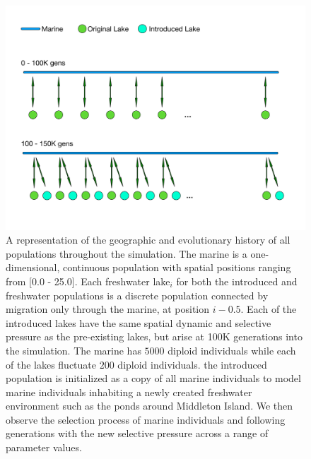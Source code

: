 \documentclass{article}
\begin{document}
\begin{figure}
	\begin{center}
  		\includegraphics[width=0.6\linewidth]{GeographyFigure.pdf}
  		\caption{
			A representation of the geographic and evolutionary history of all populations throughout the simulation. 
		The marine is a one-dimensional, continuous population with spatial positions ranging from [0.0 - 25.0]. 
		Each freshwater lake$_{i}$ for both the introduced and freshwater populations
		is a discrete population connected by migration only through the marine, at position $i - 0.5$. 
		Each of the introduced lakes have the same spatial dynamic and selective pressure as the pre-existing lakes, but arise at 100K generations into the simulation.
		The marine has $5000$ diploid individuals while each of the lakes fluctuate  $200$ diploid individuals. 
		the introduced population is initialized as a copy of all marine individuals to model marine 
		individuals inhabiting a newly created freshwater environment such as the ponds around Middleton Island.
		We then observe the selection process of marine individuals and following generations 
		with the new selective pressure across a range of parameter values. 
			}
  		\label{fig:Geo}
	\end{center}
\end{figure}
\end{document}
